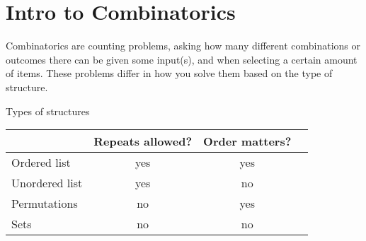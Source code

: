 
\newcommand{\laClass}       {CS 211}
\newcommand{\laSemester}    {Spring 2018}
\newcommand{\laChapter}     {5.1}
\newcommand{\laType}        {Exercise}
\newcommand{\laPoints}      {5}
\newcommand{\laTitle}       {Intro to Combinatorics}
\newcommand{\laDate}        {Jan 16, 2018}
\setcounter{chapter}{5}
\setcounter{section}{1}
\addtocounter{section}{-1}

\toggletrue{answerkey}
\togglefalse{answerkey}





    \section{\laTitle}

    Combinatorics are counting problems, asking how many different combinations
    or outcomes there can be given some input(s), and when selecting a certain
    amount of items. These problems differ in how you solve them based on
    the type of structure.

    \begin{intro}{Types of structures}
        \begin{center}
            \begin{tabular}{l | c | c | c }
                \textbf{}
                    & \textbf{Repeats allowed?}
                    & \textbf{Order matters?}
                \\ \hline
                Ordered list
                    & yes
                    & yes

                \\ \hline
                Unordered list
                    & yes
                    & no
                \\ \hline
                Permutations
                    & no
                    & yes
                \\ \hline
                Sets
                    & no
                    & no
            \end{tabular}
        \end{center}
    \end{intro}

